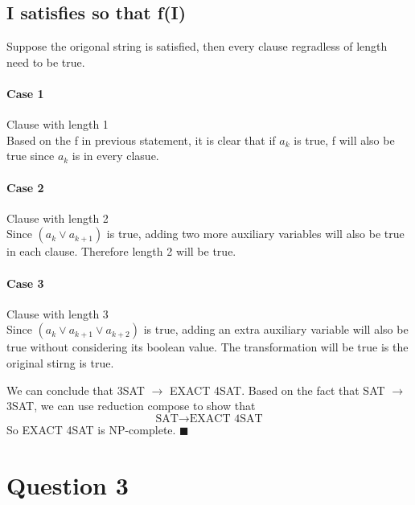 \documentclass{article}
\begin{document}
\subsection*{I satisfies so that f(I)}
Suppose the origonal string is satisfied, then every clause regradless of length need to be true. 
\paragraph*{Case 1} Clause with length 1 \\
Based on the f in previous statement, it is clear that if $a_k$ is true, f will also be true since $a_k$ is in every clasue.

\paragraph*{Case 2} Clause with length 2 \\
Since $(a_k \vee a_{k+1})$ is true, adding two more auxiliary variables will also be true in each clause. Therefore length 2 will be true.

\paragraph*{Case 3} Clause with length 3 \\
Since $(a_k \vee a_{k+1} \vee a_{k+2})$ is true, adding an extra auxiliary variable will also be true without considering its boolean value.
The transformation will be true is the original stirng is true.

We can conclude that 3SAT $\rightarrow$ EXACT 4SAT. Based on the fact that SAT $\rightarrow$ 3SAT, we can use 
reduction compose to show that 
$$\text{SAT} \rightarrow \text{EXACT 4SAT}$$
So EXACT 4SAT is NP-complete. $\blacksquare$






\section*{Question 3}
\end{document}
